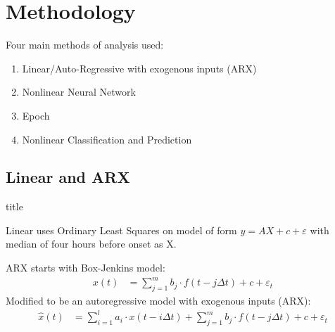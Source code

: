 \documentclass[xcolor={dvipsnames,table}]{beamer}
\newcommand{\subheader}{    		\begin{center}
  	\begin{beamercolorbox}[sep=4pt,center,shadow=true,rounded=true]{title}
  		\usebeamerfont{title}\subsecname\par%
  	\end{beamercolorbox}
  	\vfill
  	\end{center}}
\begin{document}

\section{Methodology}
\begin{frame}
Four main methods of analysis used:
\begin{enumerate}
	\item Linear/Auto-Regressive with exogenous inputs (ARX) 
	\item Nonlinear Neural Network
	\item Epoch
	\item Nonlinear Classification and Prediction
\end{enumerate}
\end{frame}

\subsection{Linear and ARX}

\begin{frame}
	\subheader
	Linear uses Ordinary Least Squares on model of form $y=AX+c+\varepsilon$ with median of four hours before onset as X. 
\newline

	ARX starts with Box-Jenkins model:
	\begin{align*}
	x(t)&=\sum_{j=1}^{m}{b_j \cdot f(t-j\Delta t)}+c + \varepsilon_t
	\end{align*}
	Modified to be an autoregressive model with exogenous inputs (ARX):
	\begin{align*}
	\hat{x}(t)&=\sum_{i=1}^la_i\cdot x(t-i\Delta t)+\sum_{j=1}^m b_j\cdot f(t-j\Delta t)+c+\varepsilon_t
	\label{ARXEqn}
	\end{align*}
\end{frame}
\end{document}
